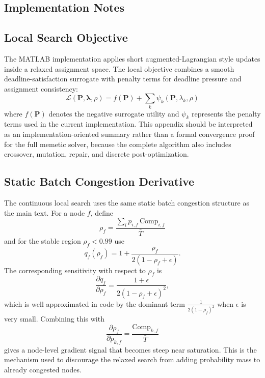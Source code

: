 \begin{appendices}
\section{Implementation Notes}

\subsection{Local Search Objective}
The MATLAB implementation applies short augmented-Lagrangian style updates inside a relaxed assignment space. The local objective combines a smooth deadline-satisfaction surrogate with penalty terms for deadline pressure and assignment consistency:
\begin{equation}
    \mathcal{L}(\mathbf{P}, \boldsymbol{\lambda}, \rho) =
    f(\mathbf{P}) + \sum_k \psi_k(\mathbf{P}, \lambda_k, \rho)
\end{equation}
where $f(\mathbf{P})$ denotes the negative surrogate utility and $\psi_k$ represents the penalty terms used in the current implementation. This appendix should be interpreted as an implementation-oriented summary rather than a formal convergence proof for the full memetic solver, because the complete algorithm also includes crossover, mutation, repair, and discrete post-optimization.

\subsection{Static Batch Congestion Derivative}
\label{appendix:gradients}
The continuous local search uses the same static batch congestion structure as the main text. For a node $f$, define
\begin{equation}
    \rho_f = \frac{\sum_i p_{i,f}\,\mathrm{Comp}_{i,f}}{\bar{T}}
\end{equation}
and for the stable region $\rho_f < 0.99$ use
\begin{equation}
    q_f(\rho_f) = 1 + \frac{\rho_f}{2(1-\rho_f+\epsilon)}.
\end{equation}
The corresponding sensitivity with respect to $\rho_f$ is
\begin{equation}
    \frac{\partial q_f}{\partial \rho_f}
    =
    \frac{1+\epsilon}{2(1-\rho_f+\epsilon)^2},
\end{equation}
which is well approximated in code by the dominant term $\frac{1}{2(1-\rho_f)^2}$ when $\epsilon$ is very small. Combining this with
\begin{equation}
    \frac{\partial \rho_f}{\partial p_{k,f}} = \frac{\mathrm{Comp}_{k,f}}{\bar{T}}
\end{equation}
gives a node-level gradient signal that becomes steep near saturation. This is the mechanism used to discourage the relaxed search from adding probability mass to already congested nodes.


\end{appendices}
